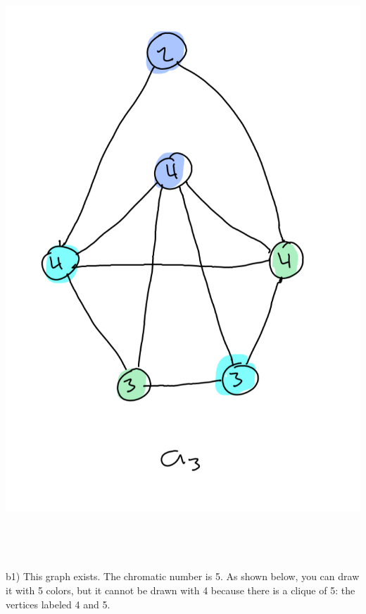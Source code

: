 \documentclass{article}
\begin{document}
\begin{solution}
	\\ \includegraphics[scale=0.5]{a3.png}
	\\\\\\\\\\
	b1) This graph exists. The chromatic number is 5. As shown below, you can draw it with 5 colors, but it cannot be drawn with 4 because there is a clique of 5: the vertices labeled 4 and 5.

\end{solution}
\end{document}
